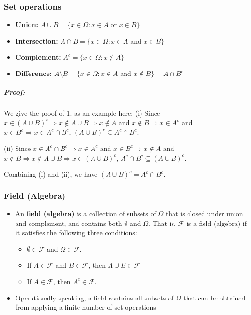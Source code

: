 \subsubsection{Set operations}

\begin{itemize}
\item \textbf{Union:} $A \cup B=\{x \in \Omega: x \in A$ or $x \in B\}$
\item \textbf{Intersection:} $A \cap B=\{x \in \Omega: x \in A$ and $x \in B\}$
\item \textbf{Complement:} $A^{c}=\{x \in \Omega: x \notin A\}$
\item \textbf{Difference:} $A \setminus B=\{x \in \Omega: x \in A$ and $x \notin B\}=A \cap B^{c}$
\end{itemize}

\subparagraph*{\textit{Proof:}}

We give the proof of 1. as an example here:\newline
 (i) Since $x \in(A \cup B)^{c} \Rightarrow x \notin A \cup B \Rightarrow 
x \notin A$ and $x \notin B \Rightarrow x \in A^{c}$ and $x \in
B^{c} \Rightarrow x \in A^{c} \cap B^c$, $(A \cup B)^{c} \subseteq A^{c} \cap B^{c}$.

(ii) Since $x \in A^{c} \cap B^{c} \Rightarrow x \in A^{c}$ and $x \in B^{c} \Rightarrow x \notin A$ and $x \notin B
\Rightarrow x \notin A \cup B \Rightarrow x \in(A \cup B)^{c}$, $A^{c} \cap B^{c} \subseteq (A \cup B)^{c}$.

Combining (i) and (ii), we have $(A \cup B)^{c} = A^{c} \cap B^{c}$.

\subsubsection{Field (Algebra)}

\begin{itemize}
\item An \textbf{field (algebra)} is a collection of subsets of $\Omega$ that is closed under union and complement, and contains both $\emptyset$ and $\Omega$. That is, $\mathcal{F}$ is a field (algebra) if it satisfies the following three conditions:

\begin{itemize}
\item $\emptyset \in \mathcal{F}$ and $\Omega \in \mathcal{F}$.
\item If $A \in \mathcal{F}$ and $B \in \mathcal{F}$, then $A \cup B \in \mathcal{F}$.
\item If $A \in \mathcal{F}$, then $A^{c} \in \mathcal{F}$.
\end{itemize}


\item Operationally speaking, a field contains all subsets of $\Omega$ that can be obtained from applying a finite number of set operations.
\end{itemize}

